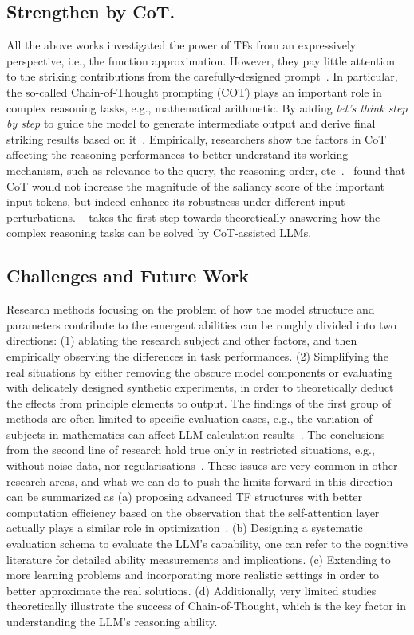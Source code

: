 \subsection{Strengthen by CoT.}
All the above works investigated the power of TFs from an expressively perspective, i.e., the function approximation. However, they pay little attention to the striking contributions from the carefully-designed prompt~\cite{DBLP:journals/tacl/JiangXAN20,DBLP:journals/csur/LiuYFJHN23,Wang2022TowardsUC}. In particular, the so-called Chain-of-Thought prompting (COT) plays an important role in complex reasoning tasks, e.g., mathematical arithmetic. By adding \textit{let's think step by step} to guide the model to generate intermediate output and derive final striking results based on it~\cite{Wei2022EmergentAO}. Empirically, researchers show the factors in CoT affecting the reasoning performances to better understand its working mechanism, such as relevance to the query, the reasoning order, etc~\cite{Wang2022TowardsUC}.~\citet{DBLP:journals/corr/abs-2307-13339} found that CoT would not increase the magnitude of the saliancy score of the important input tokens, but indeed enhance its robustness under different input perturbations. ~\citet{DBLP:journals/corr/abs-2305-15408} takes the first step towards theoretically answering how the complex reasoning tasks can be solved by CoT-assisted LLMs.

\subsection{Challenges and Future Work}
Research methods focusing on the problem of how the model structure and parameters contribute to the emergent abilities can be roughly divided into two directions: (1) ablating the research subject and other factors, and then empirically observing the differences in task performances. (2) Simplifying the real situations by either removing the obscure model components or evaluating with delicately designed synthetic experiments, in order to theoretically deduct the effects from principle elements to output. The findings of the first group of methods are often limited to specific evaluation cases, e.g., the variation of subjects in mathematics can affect LLM calculation
results~\cite{DBLP:conf/acl/StolfoJSSS23,shi2023large}. The conclusions from the second line of research hold true only in restricted situations, e.g., without noise data, nor regularisations~\cite{von2023transformers}. These issues are very common in other research areas, and what we can do to push the limits forward in this direction can be summarized as (a) proposing advanced TF structures with better computation efficiency based on the observation that the self-attention layer actually plays a similar role in optimization~\cite{zucchet2022beyond}. (b) Designing a systematic evaluation schema to evaluate the LLM's capability, one can refer to the cognitive literature for detailed ability measurements and implications. (c) Extending to more learning problems and incorporating more realistic settings in order to better approximate 
the real solutions. (d) Additionally, very limited studies theoretically illustrate the success of Chain-of-Thought, which is the key factor in understanding the LLM's reasoning ability.

